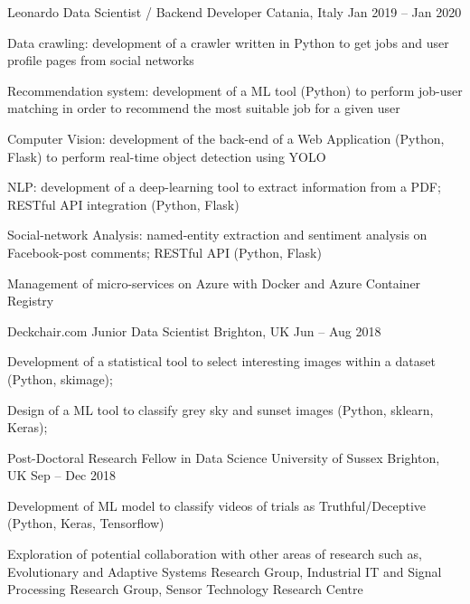 \begin{cventries}
    \cventry
    {Leonardo}    
    {Data Scientist / Backend Developer}
    {Catania, Italy}
    {Jan 2019 -- Jan 2020}
    {
      \begin{cvitems}
        \item {Data crawling: development of a crawler written in Python to get jobs and user profile pages from social networks}
        \item {Recommendation system: development of a ML tool (Python) to perform job-user matching in order to recommend the most suitable job for a given user}
        \item {Computer Vision: development of the back-end of a Web Application (Python, Flask) to perform real-time object detection using YOLO}
        \item {NLP: development of a deep-learning tool to extract information from a PDF; RESTful API integration (Python, Flask)}
        \item {Social-network Analysis: named-entity extraction and sentiment analysis on Facebook-post comments; RESTful API (Python, Flask)}
        \item {Management of micro-services on Azure with Docker and Azure Container Registry}
      \end{cvitems}
    }

    \cventry
    {Deckchair.com}
    {Junior Data Scientist}
    {Brighton, UK}
    {Jun -- Aug 2018}
    {
      \begin{cvitems}
        \item Development of a statistical tool to select interesting images within a dataset (Python, skimage);
        \item Design of a ML tool to classify grey sky and sunset images (Python, sklearn, Keras);
      \end{cvitems}
    }
  \end{cventries}

\newpage

  \begin{cventries}
    \cventry
    {Post-Doctoral Research Fellow in Data Science}
    {University of Sussex}
    {Brighton, UK}
    {Sep -- Dec 2018}
    {
      \begin{cvitems}
        \item Development of ML model to classify videos of trials as Truthful/Deceptive (Python, Keras, Tensorflow)
        \item Exploration of potential collaboration with other areas of research such as, Evolutionary and Adaptive Systems Research Group, Industrial IT and Signal Processing Research Group, Sensor Technology Research Centre
      \end{cvitems}
    }
  \end{cventries}

